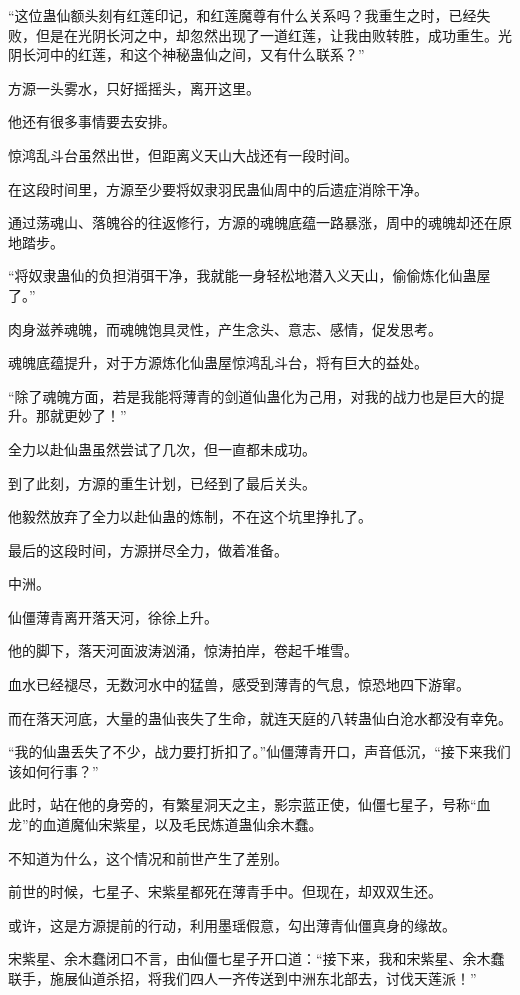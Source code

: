 \begin{this_body}
“这位蛊仙额头刻有红莲印记，和红莲魔尊有什么关系吗？我重生之时，已经失败，但是在光阴长河之中，却忽然出现了一道红莲，让我由败转胜，成功重生。光阴长河中的红莲，和这个神秘蛊仙之间，又有什么联系？”

方源一头雾水，只好摇摇头，离开这里。

他还有很多事情要去安排。

惊鸿乱斗台虽然出世，但距离义天山大战还有一段时间。

在这段时间里，方源至少要将奴隶羽民蛊仙周中的后遗症消除干净。

通过荡魂山、落魄谷的往返修行，方源的魂魄底蕴一路暴涨，周中的魂魄却还在原地踏步。

“将奴隶蛊仙的负担消弭干净，我就能一身轻松地潜入义天山，偷偷炼化仙蛊屋了。”

肉身滋养魂魄，而魂魄饱具灵性，产生念头、意志、感情，促发思考。

魂魄底蕴提升，对于方源炼化仙蛊屋惊鸿乱斗台，将有巨大的益处。

“除了魂魄方面，若是我能将薄青的剑道仙蛊化为己用，对我的战力也是巨大的提升。那就更妙了！”

全力以赴仙蛊虽然尝试了几次，但一直都未成功。

到了此刻，方源的重生计划，已经到了最后关头。

他毅然放弃了全力以赴仙蛊的炼制，不在这个坑里挣扎了。

最后的这段时间，方源拼尽全力，做着准备。

中洲。

仙僵薄青离开落天河，徐徐上升。

他的脚下，落天河面波涛汹涌，惊涛拍岸，卷起千堆雪。

血水已经褪尽，无数河水中的猛兽，感受到薄青的气息，惊恐地四下游窜。

而在落天河底，大量的蛊仙丧失了生命，就连天庭的八转蛊仙白沧水都没有幸免。

“我的仙蛊丢失了不少，战力要打折扣了。”仙僵薄青开口，声音低沉，“接下来我们该如何行事？”

此时，站在他的身旁的，有繁星洞天之主，影宗蓝正使，仙僵七星子，号称“血龙”的血道魔仙宋紫星，以及毛民炼道蛊仙余木蠢。

不知道为什么，这个情况和前世产生了差别。

前世的时候，七星子、宋紫星都死在薄青手中。但现在，却双双生还。

或许，这是方源提前的行动，利用墨瑶假意，勾出薄青仙僵真身的缘故。

宋紫星、余木蠢闭口不言，由仙僵七星子开口道：“接下来，我和宋紫星、余木蠢联手，施展仙道杀招，将我们四人一齐传送到中洲东北部去，讨伐天莲派！”


\end{this_body}
